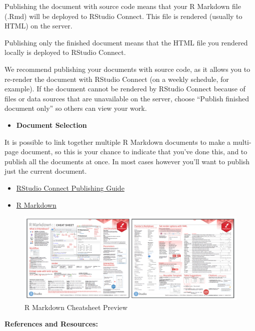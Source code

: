 \documentclass[]{book}
\providecommand{\tightlist}{%
  \setlength{\itemsep}{0pt}\setlength{\parskip}{0pt}}
\theoremstyle{definition}
\theoremstyle{definition}
\theoremstyle{definition}
\theoremstyle{remark}
\begin{document}
Publishing the document with source code means that your R Markdown file
(.Rmd) will be deployed to RStudio Connect. This file is rendered
(usually to HTML) on the server.

Publishing only the finished document means that the HTML file you
rendered locally is deployed to RStudio Connect.

We recommend publishing your documents with source code, as it allows
you to re-render the document with RStudio Connect (on a weekly
schedule, for example). If the document cannot be rendered by RStudio
Connect because of files or data sources that are unavailable on the
server, choose ``Publish finished document only'' so others can view
your work.

\begin{itemize}
\tightlist
\item
  \textbf{Document Selection}
\end{itemize}

It is possible to link together multiple R Markdown documents to make a
multi-page document, so this is your chance to indicate that you've done
this, and to publish all the documents at once. In most cases however
you'll want to publish just the current document.

\begin{itemize}
\item
  \href{https://docs.rstudio.com/connect/user/publishing.html\#publishing-documents}{RStudio
  Connect Publishing Guide}
\item
  \href{https://rmarkdown.rstudio.com/}{R Markdown}
\end{itemize}

\begin{figure}
\centering
\includegraphics{imgs/shiny-alt/rmd-cheatsheet.png}
\caption{R Markdown Cheatsheet Preview}
\end{figure}

\textbf{References and Resources:}
\end{document}
